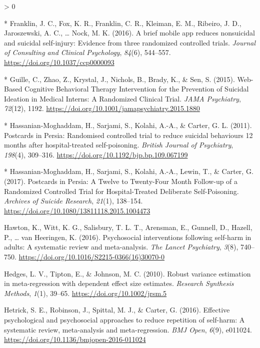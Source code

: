 \documentclass[
  english,
  man]{apa6}
\newlength{\cslhangindent}
\newenvironment{CSLReferences}[2] %
 {%
  \setlength{\parindent}{0pt}
  \ifodd #1 \everypar{\setlength{\hangindent}{\cslhangindent}}\ignorespaces\fi
  \ifnum #2 > 0
  \setlength{\parskip}{#2\baselineskip}
  \fi
 }%
 {}
\begin{document}
\begin{CSLReferences}{1}{0}
\leavevmode\hypertarget{ref-franklin2016}{}%
* Franklin, J. C., Fox, K. R., Franklin, C. R., Kleiman, E. M., Ribeiro, J. D., Jaroszewski, A. C., \ldots{} Nock, M. K. (2016). A brief mobile app reduces nonsuicidal and suicidal self-injury: {Evidence} from three randomized controlled trials. \emph{Journal of Consulting and Clinical Psychology}, \emph{84}(6), 544--557. \url{https://doi.org/10.1037/ccp0000093}

\leavevmode\hypertarget{ref-guille2015}{}%
* Guille, C., Zhao, Z., Krystal, J., Nichols, B., Brady, K., \& Sen, S. (2015). Web-{Based Cognitive Behavioral Therapy Intervention} for the {Prevention} of {Suicidal Ideation} in {Medical Interns}: {A Randomized Clinical Trial}. \emph{JAMA Psychiatry}, \emph{72}(12), 1192. \url{https://doi.org/10.1001/jamapsychiatry.2015.1880}

\leavevmode\hypertarget{ref-hassanian-moghaddam2011}{}%
* Hassanian-Moghaddam, H., Sarjami, S., Kolahi, A.-A., \& Carter, G. L. (2011). Postcards in {Persia}: {Randomised} controlled trial to reduce suicidal behaviours 12 months after hospital-treated self-poisoning. \emph{British Journal of Psychiatry}, \emph{198}(4), 309--316. \url{https://doi.org/10.1192/bjp.bp.109.067199}

\leavevmode\hypertarget{ref-hassanian-moghaddam2017}{}%
* Hassanian-Moghaddam, H., Sarjami, S., Kolahi, A.-A., Lewin, T., \& Carter, G. (2017). Postcards in {Persia}: {A Twelve} to {Twenty-Four Month Follow-up} of a {Randomized Controlled Trial} for {Hospital-Treated Deliberate Self-Poisoning}. \emph{Archives of Suicide Research}, \emph{21}(1), 138--154. \url{https://doi.org/10.1080/13811118.2015.1004473}

\leavevmode\hypertarget{ref-hawton2016}{}%
Hawton, K., Witt, K. G., Salisbury, T. L. T., Arensman, E., Gunnell, D., Hazell, P., \ldots{} van Heeringen, K. (2016). Psychosocial interventions following self-harm in adults: A systematic review and meta-analysis. \emph{The Lancet Psychiatry}, \emph{3}(8), 740--750. \url{https://doi.org/10.1016/S2215-0366(16)30070-0}

\leavevmode\hypertarget{ref-hedges2010}{}%
Hedges, L. V., Tipton, E., \& Johnson, M. C. (2010). Robust variance estimation in meta-regression with dependent effect size estimates. \emph{Research Synthesis Methods}, \emph{1}(1), 39--65. \url{https://doi.org/10.1002/jrsm.5}

\leavevmode\hypertarget{ref-hetrick2016}{}%
Hetrick, S. E., Robinson, J., Spittal, M. J., \& Carter, G. (2016). Effective psychological and psychosocial approaches to reduce repetition of self-harm: A systematic review, meta-analysis and meta-regression. \emph{BMJ Open}, \emph{6}(9), e011024. \url{https://doi.org/10.1136/bmjopen-2016-011024}


\end{CSLReferences}
\end{document}
